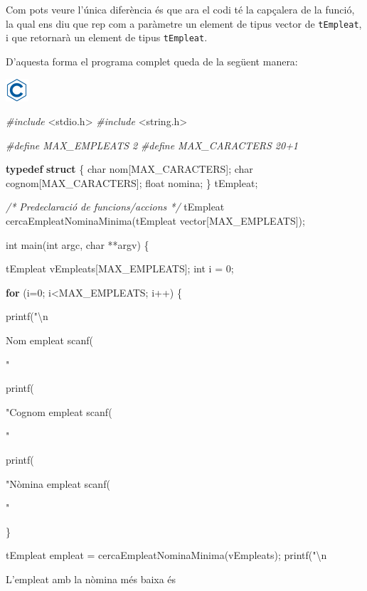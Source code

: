 \documentclass[]{book}
\newenvironment{Shaded}{\begin{snugshade}}{\end{snugshade}}
\newcommand{\KeywordTok}[1]{\textcolor[rgb]{0.13,0.29,0.53}{\textbf{#1}}}
\newcommand{\DataTypeTok}[1]{\textcolor[rgb]{0.13,0.29,0.53}{#1}}
\newcommand{\DecValTok}[1]{\textcolor[rgb]{0.00,0.00,0.81}{#1}}
\newcommand{\SpecialCharTok}[1]{\textcolor[rgb]{0.00,0.00,0.00}{#1}}
\newcommand{\StringTok}[1]{\textcolor[rgb]{0.31,0.60,0.02}{#1}}
\newcommand{\ImportTok}[1]{#1}
\newcommand{\CommentTok}[1]{\textcolor[rgb]{0.56,0.35,0.01}{\textit{#1}}}
\newcommand{\ControlFlowTok}[1]{\textcolor[rgb]{0.13,0.29,0.53}{\textbf{#1}}}
\newcommand{\PreprocessorTok}[1]{\textcolor[rgb]{0.56,0.35,0.01}{\textit{#1}}}
\newcommand{\NormalTok}[1]{#1}
\begin{document}
Com pots veure l'única diferència és que ara el codi té la capçalera de
la funció, la qual ens diu que rep com a paràmetre un element de tipus
vector de \texttt{tEmpleat}, i que retornarà un element de tipus
\texttt{tEmpleat}.

D'aquesta forma el programa complet queda de la següent manera:

\includegraphics{./img/c.png}

\begin{Shaded}
\begin{Highlighting}[]
\PreprocessorTok{#include }\ImportTok{<stdio.h>}
\PreprocessorTok{#include }\ImportTok{<string.h>}

\PreprocessorTok{#define MAX_EMPLEATS 2}
\PreprocessorTok{#define MAX_CARACTERS 20+1}

\KeywordTok{typedef} \KeywordTok{struct}\NormalTok{ \{}
    \DataTypeTok{char}\NormalTok{ nom[MAX_CARACTERS];}
    \DataTypeTok{char}\NormalTok{ cognom[MAX_CARACTERS];}
    \DataTypeTok{float}\NormalTok{ nomina;}
\NormalTok{\} tEmpleat;}

\CommentTok{/* Predeclaració de funcions/accions */}
\NormalTok{tEmpleat cercaEmpleatNominaMinima(tEmpleat vector[MAX_EMPLEATS]);}

\DataTypeTok{int}\NormalTok{ main(}\DataTypeTok{int}\NormalTok{ argc, }\DataTypeTok{char}\NormalTok{ **argv) \{}

\NormalTok{    tEmpleat vEmpleats[MAX_EMPLEATS];}
    \DataTypeTok{int}\NormalTok{ i = }\DecValTok{0}\NormalTok{;}

    \ControlFlowTok{for}\NormalTok{ (i=}\DecValTok{0}\NormalTok{; i<MAX_EMPLEATS; i++) \{}

\NormalTok{        printf(}\StringTok{"}\SpecialCharTok{\textbackslash{}n}\StringTok{Nom empleat %
\NormalTok{        scanf(}\StringTok{"%

\NormalTok{        printf(}\StringTok{"Cognom empleat %
\NormalTok{        scanf(}\StringTok{"%

\NormalTok{        printf(}\StringTok{"Nòmina empleat %
\NormalTok{        scanf(}\StringTok{"%

\NormalTok{    \}}

\NormalTok{    tEmpleat empleat = cercaEmpleatNominaMinima(vEmpleats);}
\NormalTok{    printf(}\StringTok{"}\SpecialCharTok{\textbackslash{}n}\StringTok{L'empleat amb la nòmina més baixa és %

}}}}}}}
\end{Highlighting}
\end{Shaded}
\end{document}
